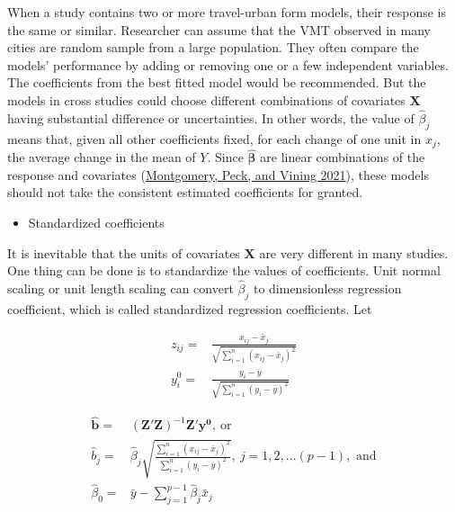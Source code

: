 \documentclass[
  11pt,
  openany]{memoir}
\providecommand{\tightlist}{%
  \setlength{\itemsep}{0pt}\setlength{\parskip}{0pt}}
\begin{document}
When a study contains two or more travel-urban form models, their response is the same or similar. Researcher can assume that the VMT observed in many cities are random sample from a large population. They often compare the models' performance by adding or removing one or a few independent variables. The coefficients from the best fitted model would be recommended.
But the models in cross studies could choose different combinations of covariates \(\mathbf{X}\) having substantial difference or uncertainties.
In other words, the value of \(\hat \beta_j\) means that, given all other coefficients fixed, for each change of one unit in \(x_j\), the average change in the mean of \(Y\).
Since \(\boldsymbol{\hat\beta}\) are linear combinations of the response and covariates (\protect\hyperlink{ref-montgomeryIntroductionLinearRegression2021}{Montgomery, Peck, and Vining 2021}),
these models should not take the consistent estimated coefficients for granted.

\begin{itemize}
\tightlist
\item
  Standardized coefficients
\end{itemize}

It is inevitable that the units of covariates \(\mathbf{X}\) are very different in many studies. One thing can be done is to
standardize the values of coefficients.
Unit normal scaling or unit length scaling can convert \(\hat \beta_j\) to dimensionless regression coefficient, which is called standardized regression coefficients. Let

\begin{equation}
\begin{split}
z_{ij}=&\frac{x_{ij}-\bar x_j}{\sqrt{\sum_{i=1}^{n}(x_{ij}-\bar x_j)^2}}\\
y^{0}_{i}=&\frac{y_{i}-\bar y}{\sqrt{\sum_{i=1}^{n}(y_{i}-\bar y)^2}}
\end{split}
\label{eq:standize}
\end{equation}

\begin{equation}
\begin{split}
\mathbf{\hat b}=&(\mathbf{Z'Z})^{-1}\mathbf{Z'}\mathbf{y^{0}},\ \text{or}\\
\hat b_j= &\hat\beta_j\sqrt{\frac{\sum_{i=1}^{n}(x_{ij}-\bar x_j)^2}{\sum_{i=1}^{n}(y_{i}-\bar y)^2}},\ j=1,2,...(p-1),\text{ and}\\
\hat\beta_0=&\bar y - \sum_{j=1}^{p-1}\hat\beta_j\bar x_j
\end{split}
\label{eq:stand-coef}
\end{equation}
\end{document}
